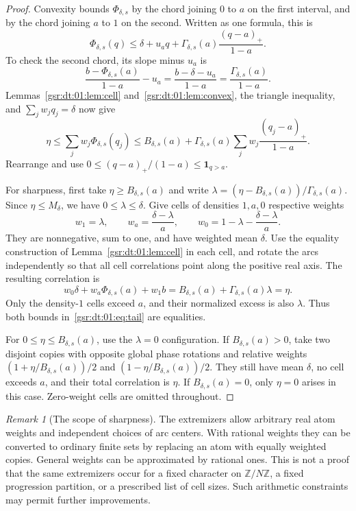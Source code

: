 \documentclass[11pt,letterpaper]{article}
\numberwithin{equation}{section}
\theoremstyle{definition}
\theoremstyle{remark}
\newtheorem{remark}[theorem]{Remark}
\newcommand{\Z}{\mathbb Z}
\newcommand{\one}{\mathbf 1}
\newcommand{\1}{\mathbf 1}
\newcommand{\pos}[1]{\left(#1\right)_{+}}
\newcommand{\ph}{\Phi_{\delta,s}}
\newcommand{\BB}{B_{\delta,s}}
\newcommand{\GG}{\Gamma_{\delta,s}}
\begin{document}
\begin{proof}
Convexity bounds $\ph$ by the chord joining $0$ to $a$ on the first
interval, and by the chord joining $a$ to $1$ on the second. Written as
one formula, this is
\begin{equation}\label{gsr:dt:01:eq:brokenchord}
 \ph(q)\le\delta+u_aq+
       \GG(a)\frac{\pos{q-a}}{1-a}.
\end{equation}
To check the second chord, its slope minus $u_a$ is
\[
 \frac{b-\ph(a)}{1-a}-u_a
 =\frac{b-\delta-u_a}{1-a}
 =\frac{\GG(a)}{1-a}.
\]
Lemmas~\ref{gsr:dt:01:lem:cell} and~\ref{gsr:dt:01:lem:convex}, the triangle inequality, and
$\sum_jw_jq_j=\delta$ now give
\begin{equation}\label{gsr:dt:01:eq:mainchord}
 \eta\le\sum_jw_j\ph(q_j)
 \le\BB(a)+\GG(a)\sum_jw_j\frac{\pos{q_j-a}}{1-a}.
\end{equation}
Rearrange and use $0\le(q-a)_+/(1-a)\le\one_{q>a}$.

For sharpness, first take $\eta\ge\BB(a)$ and write
$\lambda=(\eta-\BB(a))/\GG(a)$. Since $\eta\le M_\delta$, we have
$0\le\lambda\le\delta$. Give cells of densities $1,a,0$ respective weights
\begin{equation}\label{gsr:dt:01:eq:extremalweights}
 w_1=\lambda,\qquad
 w_a=\frac{\delta-\lambda}{a},\qquad
 w_0=1-\lambda-\frac{\delta-\lambda}{a}.
\end{equation}
They are nonnegative, sum to one, and have weighted mean $\delta$.
Use the equality construction of Lemma~\ref{gsr:dt:01:lem:cell} in each cell, and
rotate the arcs independently so that all cell correlations point along
the positive real axis. The resulting correlation is
\[
 w_0\delta+w_a\ph(a)+w_1b=\BB(a)+\GG(a)\lambda=\eta.
\]
Only the density-$1$ cells exceed $a$, and their normalized excess is also
$\lambda$. Thus both bounds in~\eqref{gsr:dt:01:eq:tail} are equalities.

For $0\le\eta\le\BB(a)$, use the $\lambda=0$ configuration. If
$\BB(a)>0$, take two disjoint copies with opposite global phase rotations
and relative weights $(1+\eta/\BB(a))/2$ and
$(1-\eta/\BB(a))/2$. They still have mean $\delta$, no cell exceeds $a$,
and their total correlation is $\eta$. If $\BB(a)=0$, only $\eta=0$
arises in this case. Zero-weight cells are omitted throughout.
\end{proof}

\begin{remark}[The scope of sharpness]\label{gsr:dt:01:rem:sharpnessscope}
The extremizers allow arbitrary real atom weights and independent choices
of arc centers. With rational weights they can be converted to ordinary
finite sets by replacing an atom with equally weighted copies. General
weights can be approximated by rational ones. This is not a proof that the
same extremizers occur for a fixed character on $\Z/N\Z$, a fixed
progression partition, or a prescribed list of cell sizes. Such arithmetic
constraints may permit further improvements.
\end{remark}
\end{document}
